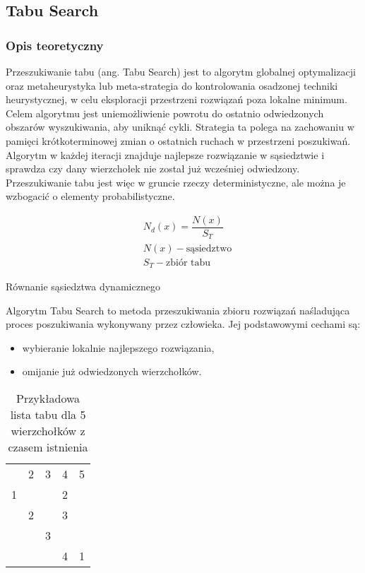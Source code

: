 \documentclass[12pt,a4paper,titlepage]{article}
\begin{document}
\subsection{Tabu Search}
\subsubsection{Opis teoretyczny}
Przeszukiwanie tabu (ang. Tabu Search) jest to algorytm globalnej optymalizacji oraz metaheurystyka lub meta-strategia do kontrolowania osadzonej techniki heurystycznej, w celu eksploracji przestrzeni rozwiązań poza lokalne minimum. Celem algorytmu jest uniemożliwienie powrotu do ostatnio odwiedzonych obszarów wyszukiwania, aby uniknąć cykli. Strategia ta polega na zachowaniu w pamięci krótkoterminowej zmian o ostatnich ruchach w przestrzeni poszukiwań. Algorytm w każdej iteracji znajduje najlepsze rozwiązanie w sąsiedztwie i sprawdza czy dany wierzchołek nie został już wcześniej odwiedzony. Przeszukiwanie tabu jest więc w gruncie rzeczy deterministyczne, ale można je wzbogacić o elementy probabilistyczne.

\begin{myequation}[H]
\begin{equation}
    \begin{split}
    &N_{d}(x) = \dfrac{N(x)}{S_{T}} \\
    &N(x) - \text{sąsiedztwo} \\
    &S_{T} - \text{zbiór tabu}
    \end{split}
\end{equation}
\caption{Równanie sąsiedztwa dynamicznego}
\end{myequation}

Algorytm Tabu Search to metoda przeszukiwania zbioru rozwiązań naśladująca proces poszukiwania wykonywany przez człowieka. Jej podstawowymi cechami są:
\begin{itemize}
    \item wybieranie lokalnie najlepszego rozwiązania,
    \item omijanie już odwiedzonych wierzchołków.
\end{itemize}

\begin{table}[H]
    \centering
    \caption{Przykładowa lista tabu dla 5 wierzchołków z czasem istnienia}
    \begin{tabular}{ccccc}
         & 2 & 3 & 4 & 5  \\
         \cline{2-5}
         \multicolumn{1}{c|}{1} &  \multicolumn{1}{c|}{} &  \multicolumn{1}{c|}{} & \multicolumn{1}{c|}{2}  & \multicolumn{1}{c|}{}\\
         \cline{2-5}
         & \multicolumn{1}{c|}{2}  &  \multicolumn{1}{c|}{} &  \multicolumn{1}{c|}{3} & \multicolumn{1}{c|}{}\\
         \cline{3-5}
         &   & \multicolumn{1}{c|}{3}  &  \multicolumn{1}{c|}{} & \multicolumn{1}{c|}{}\\
         \cline{4-5}
         &   &   &  \multicolumn{1}{c|}{4} & \multicolumn{1}{c|}{1}\\
         \cline{5-5}
    \end{tabular}
    \label{tab:my_label}
\end{table}
\end{document}

